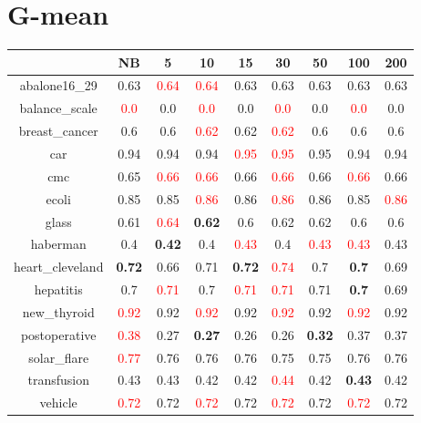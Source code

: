 \documentclass{article}%
\begin{document}
\section*{G{-}mean}%
\begin{tabular}{c|cccccccc}%
\hline%
&NB&5&10&15&30&50&100&200\\%
\hline%
abalone16\_29&0.63&\textcolor{red}{ 
0.64
}&\textcolor{red}{ 
0.64
}&0.63&0.63&0.63&0.63&0.63\\%
\hline%
balance\_scale&\textcolor{red}{ 
0.0
}&0.0&\textcolor{red}{ 
0.0
}&0.0&\textcolor{red}{ 
0.0
}&0.0&\textcolor{red}{ 
0.0
}&0.0\\%
\hline%
breast\_cancer&0.6&0.6&\textcolor{red}{ 
0.62
}&0.62&\textcolor{red}{ 
0.62
}&0.6&0.6&0.6\\%
\hline%
car&0.94&0.94&0.94&\textcolor{red}{ 
0.95
}&\textcolor{red}{ 
0.95
}&0.95&0.94&0.94\\%
\hline%
cmc&0.65&\textcolor{red}{ 
0.66
}&\textcolor{red}{ 
0.66
}&0.66&\textcolor{red}{ 
0.66
}&0.66&\textcolor{red}{ 
0.66
}&0.66\\%
\hline%
ecoli&0.85&0.85&\textcolor{red}{ 
0.86
}&0.86&\textcolor{red}{ 
0.86
}&0.86&0.85&\textcolor{red}{ 
0.86
}\\%
\hline%
glass&0.61&\textcolor{red}{ 
0.64
}&\textbf{0.62}&0.6&0.62&0.62&0.6&0.6\\%
\hline%
haberman&0.4&\textbf{0.42}&0.4&\textcolor{red}{ 
0.43
}&0.4&\textcolor{red}{ 
0.43
}&\textcolor{red}{ 
0.43
}&0.43\\%
\hline%
heart\_cleveland&\textbf{0.72}&0.66&0.71&\textbf{0.72}&\textcolor{red}{ 
0.74
}&0.7&\textbf{0.7}&0.69\\%
\hline%
hepatitis&0.7&\textcolor{red}{ 
0.71
}&0.7&\textcolor{red}{ 
0.71
}&\textcolor{red}{ 
0.71
}&0.71&\textbf{0.7}&0.69\\%
\hline%
new\_thyroid&\textcolor{red}{ 
0.92
}&0.92&\textcolor{red}{ 
0.92
}&0.92&\textcolor{red}{ 
0.92
}&0.92&\textcolor{red}{ 
0.92
}&0.92\\%
\hline%
postoperative&\textcolor{red}{ 
0.38
}&0.27&\textbf{0.27}&0.26&0.26&\textbf{0.32}&0.37&0.37\\%
\hline%
solar\_flare&\textcolor{red}{ 
0.77
}&0.76&0.76&0.76&0.75&0.75&0.76&0.76\\%
\hline%
transfusion&0.43&0.43&0.42&0.42&\textcolor{red}{ 
0.44
}&0.42&\textbf{0.43}&0.42\\%
\hline%
vehicle&\textcolor{red}{ 
0.72
}&0.72&\textcolor{red}{ 
0.72
}&0.72&\textcolor{red}{ 
0.72
}&0.72&\textcolor{red}{ 
0.72
}&0.72\\%

\end{tabular}
\end{document}
